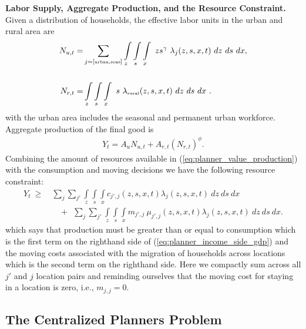 \documentclass[12pt,pdftex]{article}
\begin{document}
\begin{onehalfspacing}
\textbf{Labor Supply, Aggregate Production, and the Resource Constraint.} Given a distribution of households, the effective labor units in the urban and rural area are
\begin{align}
N_{u,t} =& \sum_{j = [\mbox{\tiny urban}, \mbox{\tiny seas}]}\int\limits_{z} \int\limits_{s} \int\limits_{x} \  z s^{\gamma} \ \lambda_j(z, s, x, t) \ dz \ ds \ dx, \nonumber
\\
\nonumber \\
N_{r,t} =& \int\limits_{z} \int\limits_{s} \int\limits_{x} \ s \ \lambda_{\mbox{\tiny rural}}(z, s, x, t)\ dz \ ds \ dx \ .
\label{eq:planner_labor_supply}
\end{align}
with the urban area includes the seasonal and permanent urban workforce. Aggregate production of the final good is
\begin{align}
Y_t = A_u N_{u,t} + A_{r,t} \left(N_{r,t} \right)^{\phi}.
\label{eq:planner_value_production}
\end{align}
Combining the amount of resources available in (\ref{eq:planner_value_production}) with the consumption and moving decisions we have the following resource constraint:
\begin{align}
Y_t\  \geq \ & \sum_{j}\sum_{j'} \int\limits_{z} \int\limits_{s} \int\limits_{x} c_{j',j}(z, s, x, t) \lambda_{j}(z, s, x, t) \ dz \ ds \ dx  \nonumber \\
& \ \ \ \ +  \ \  \sum_{j}\sum_{j'} \int\limits_{z} \int\limits_{s} \int\limits_{x}  m_{j',j} \ \mu_{j',j}(z,s, x, t) \lambda_{j}(z, s, x, t) \ dz \ ds \ dx.
\label{eq:planner_income_side_gdp}
\end{align}
which says that production must be greater than or equal to consumption which is the first term on the righthand side of (\ref{eq:planner_income_side_gdp}) and the moving costs associated with the migration of households across locations which is the second term on the righthand side. Here we compactly sum across all $j'$ and $j$ location pairs and reminding ourselves that the moving cost for staying in a location is zero, i.e., $m_{j,j} = 0$.

\subsection{The Centralized Planners Problem}


\end{onehalfspacing}
\end{document}
